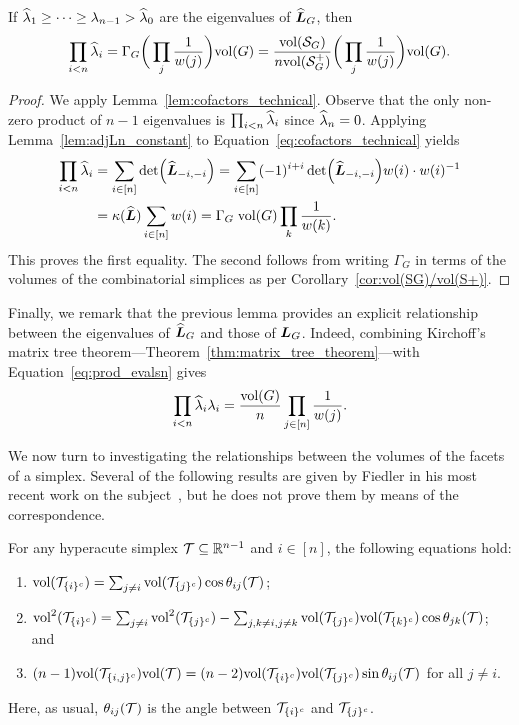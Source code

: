 \begin{lemma}
	\label{lem:prod_evalsn}
	If $\widehat{\lambda}_1\geq \dots \geq  \lambda_{n-1}>\widehat{\lambda}_0$ are the eigenvalues of $\widehat{\vb*{L}}_G$, then 
	\begin{equation}
	\label{eq:prod_evalsn}
	\prod_{i<n} \widehat{\lambda}_i =\Gamma_G\bigg(\prod_j \frac{1}{w(j)}\bigg) \textnormal{vol}(G) = \frac{\textnormal{vol}(\mathcal{S}_G)}{n\textnormal{vol}(\mathcal{S}^+_G)}\bigg(\prod_j \frac{1}{w(j)}\bigg) \textnormal{vol}(G). 
	\end{equation}
\end{lemma}
\begin{proof}
	We apply Lemma~\ref{lem:cofactors_technical}. 
	Observe that the only non-zero product of  $n-1$ eigenvalues is $\prod_{i<n} \widehat{\lambda}_i$ since $\widehat{\lambda}_n=0$.  Applying  Lemma~\ref{lem:adjLn_constant} to Equation~\eqref{eq:cofactors_technical} yields 
	\begin{align*}
	\prod_{i<n}\widehat{\lambda}_i &=  \sum_{i\in[n]} \det(\widehat{\vb*{L}}_{-i,-i}) =  \sum_{i\in[n]} (-1)^{i+i}\det(\widehat{\vb*{L}}_{-i,-i}) w(i) \cdot w(i)^{-1}\\
	&= \kappa(\widehat{\vb*{L}}) \sum_{i\in[n]} w(i) = \Gamma_G\; \textnormal{vol}(G) \prod_k\frac{1}{w(k)}.  
	\end{align*}
	This proves the first  equality. The second follows from writing $\Gamma_G$ in terms of the volumes of the combinatorial simplices as per Corollary~\ref{cor:vol(SG)/vol(S+)}. 
\end{proof}

Finally,  we remark that the previous lemma provides an explicit relationship  between the  eigenvalues of  $\widehat{\vb*{L}}_G$ and those of $\vb*{L}_G$. Indeed, combining Kirchoff's matrix tree theorem---Theorem~\ref{thm:matrix_tree_theorem}---with  Equation~\eqref{eq:prod_evalsn} gives 
\begin{equation*}
	\prod_{i<n}\widehat{\lambda}_i \lambda_i = \frac{\textnormal{vol}(G)}{n}\prod_{j\in[n]}\frac{1}{w(j)}.
\end{equation*}



We now turn  to  investigating the   relationships between the volumes  of the facets  of a  simplex. Several of the following results  are given  by  Fiedler in  his most  recent  work on the subject~\cite{fiedler2011matrices}, but  he  does  not prove them by  means of  the correspondence. 

\begin{lemma}
	\label{lem:volT_multi}
	For any hyperacute simplex $\mathcal{T}\subseteq\mathbb{R}^{n-1}$ and  $i\in[n]$, the following equations hold:
	\begin{enumerate}
		\item $\textnormal{vol}(\mathcal{T}_{\{i\}^c}) = \sum_{j\neq i}\textnormal{vol}(\mathcal{T}_{\{j\}^c})\cos\theta_{ij}(\mathcal{T})$;
		\item $\textnormal{vol}^2(\mathcal{T}_{\{i\}^c}) =  \sum_{j\neq i}\textnormal{vol}^2(\mathcal{T}_{\{j\}^c}) - \sum_{j,k\neq i,j\neq k} \textnormal{vol}(\mathcal{T}_{\{j\}^c})\textnormal{vol}(\mathcal{T}_{\{k\}^c})\cos\theta_{jk}(\mathcal{T})$; and
		\item $(n-1)\textnormal{vol}(\mathcal{T}_{\{i,j\}^c})\textnormal{vol}(\mathcal{T}) = (n-2)\textnormal{vol}(\mathcal{T}_{\{i\}^c})\textnormal{vol}(\mathcal{T}_{\{j\}^c})\sin\theta_{ij}(\mathcal{T})$ for  all $j\neq i$. 
	\end{enumerate}
	Here, as usual, $\theta_{ij}(\mathcal{T})$ is the angle between $\mathcal{T}_{\{i\}^c}$ and $\mathcal{T}_{\{j\}^c}$. 
\end{lemma}

